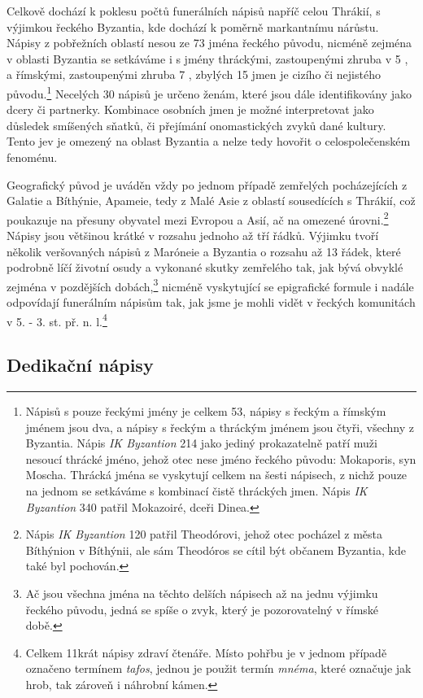 Celkově dochází k poklesu počtů funerálních nápisů napříč celou Thrákií, s výjimkou řeckého Byzantia, kde dochází k poměrně markantnímu nárůstu. Nápisy z pobřežních oblastí nesou ze 73  jména řeckého původu, nicméně zejména v oblasti Byzantia se setkáváme i s jmény thráckými, zastoupenými zhruba v 5 , a římskými, zastoupenými zhruba 7 , zbylých 15  jmen je cizího či nejistého původu.\footnote{Nápisů s pouze řeckými jmény je celkem 53, nápisy s řeckým a římským jménem jsou dva, a nápisy s řeckým a thráckým jménem jsou čtyři, všechny z Byzantia. Nápis {\em IK Byzantion} 214 jako jediný prokazatelně patří muži nesoucí thrácké jméno, jehož otec nese jméno řeckého původu: Mokaporis, syn Moscha. Thrácká jména se vyskytují celkem na šesti nápisech, z nichž pouze na jednom se setkáváme s kombinací čistě thráckých jmen. Nápis {\em IK Byzantion} 340 patřil Mokazoiré, dceři Dinea.} Necelých 30  nápisů je určeno ženám, které jsou dále identifikovány jako dcery či partnerky. Kombinace osobních jmen je možné interpretovat jako důsledek smíšených sňatků, či přejímání onomastických zvyků dané kultury. Tento jev je omezený na oblast Byzantia a nelze tedy hovořit o celospolečenském fenoménu.

Geografický původ je uváděn vždy po jednom případě zemřelých pocházejících z Galatie a Bíthýnie, Apameie, tedy z Malé Asie z oblastí sousedících s Thrákií, což poukazuje na přesuny obyvatel mezi Evropou a Asií, ač na omezené úrovni.\footnote{Nápis {\em IK Byzantion} 120 patřil Theodórovi, jehož otec pocházel z města Bíthýnion v Bíthýnii, ale sám Theodóros se cítil být občanem Byzantia, kde také byl pochován.} Nápisy jsou většinou krátké v rozsahu jednoho až tří řádků. Výjimku tvoří několik veršovaných nápisů z Maróneie a Byzantia o rozsahu až 13 řádek, které podrobně líčí životní osudy a vykonané skutky zemřelého tak, jak bývá obvyklé zejména v pozdějších dobách,\footnote{Ač jsou všechna jména na těchto delších nápisech až na jednu výjimku řeckého původu, jedná se spíše o zvyk, který je pozorovatelný v římské době.} nicméně vyskytující se epigrafické formule i nadále odpovídají funerálním nápisům tak, jak jsme je mohli vidět v řeckých komunitách v 5. - 3. st. př. n. l.\footnote{Celkem 11krát nápisy zdraví čtenáře. Místo pohřbu je v jednom případě označeno termínem {\em tafos}, jednou je použit termín {\em mnéma}, které označuje jak hrob, tak zároveň i náhrobní kámen.}

\subsection[dedikační-nápisy-7]{Dedikační nápisy}

